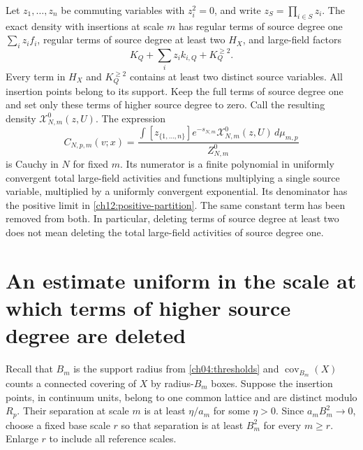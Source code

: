Let $z_1,\ldots,z_n$ be commuting variables with $z_i^2=0$, and write
$z_S=\prod_{i\in S}z_i$. The exact density with insertions at scale $m$ has
regular terms of source degree one $\sum_i z_i f_i$, regular terms of source degree at least two
$H_X$, and large-field factors
\[
 K_Q+\sum_i z_i k_{i,Q}+K_Q^{\ge2}.
\]
Every term in $H_X$ and $K_Q^{\ge2}$ contains at least two distinct
source variables. All insertion points belong to its support. Keep the full
terms of source degree one and set only these terms of higher source degree to zero. Call the
resulting density $\mathscr X^0_{N,m}(z,U)$. The expression
\begin{equation}
 C_{N,p,m}(v;x)=
 \frac{\int[z_{\{1,\ldots,n\}}]
            e^{-s_{N,m}}\mathscr X^0_{N,m}(z,U)\,d\mu_{m,p}}
      {Z^0_{N,m}}
 \label{ch12:stopped}
\end{equation}
is Cauchy in $N$ for fixed $m$. Its numerator is a finite polynomial
in uniformly convergent total large-field activities and functions multiplying a single source variable,
multiplied by a uniformly convergent exponential. Its denominator has
the positive limit in \eqref{ch12:positive-partition}. The same constant term
has been removed from both. In particular, deleting terms of source degree at least two does
not mean deleting the total large-field activities of source degree one.

\section{An estimate uniform in the scale at which terms of higher source degree are deleted}
\label{ch12:stopping}

Recall that $B_m$ is the support radius from \eqref{ch04:thresholds}
and $\operatorname{cov}_{B_m}(X)$ counts a connected covering of $X$ by
radius-$B_m$ boxes. Suppose the insertion points, in continuum units, belong to one common
lattice and are distinct modulo $R_p$. Their separation at scale $m$
is at least $\eta/a_m$ for some $\eta>0$. Since $a_mB_m^2\to0$,
choose a fixed base scale $r$ so that separation is at least $B_m^2$
for every $m\ge r$. Enlarge $r$ to include all reference scales.

